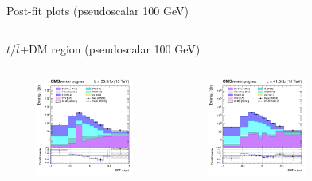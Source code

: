 \documentclass[8pt]{beamer}
\begin{document}
\begin{frame}{Post-fit plots (pseudoscalar 100 GeV)}
\begin{columns}
\begin{column}{1.09\textwidth}
\begin{block}{\centering $t/\bar t$+DM region (pseudoscalar 100 GeV)}\end{block} \vspace{10pt}
\end{column}
\end{columns} \vspace{-24pt}
\begin{columns}
		\begin{column}{0.33\textwidth}
			\begin{center}
			\begin{block}{}\end{block}	
     			\includegraphics[width=1.0\textwidth, height=90pt]{figs/postfits/2016/log_cratio_ST_topCR_ll_BDT_tDM100_TTbar_BDT_output_pseudoscalar100_customBinsAttempt7.png}
    		\end{center}		
		\end{column} 
		\begin{column}{0.33\textwidth}
			\begin{center}
			\begin{block}{}\end{block}	
     			\includegraphics[width=1.0\textwidth, height=90pt]{figs/postfits/2017/log_cratio_ST_topCR_ll_BDT_tDM100_TTbar_BDT_output_pseudoscalar100_customBinsAttempt7.png}
    		\end{center}		
		\end{column} 
		\begin{column}{0.33\textwidth}
			\begin{center}
			\begin{block}{}\end{block}	

\end{center}
\end{column}
\end{columns}
\end{frame}
\end{document}
